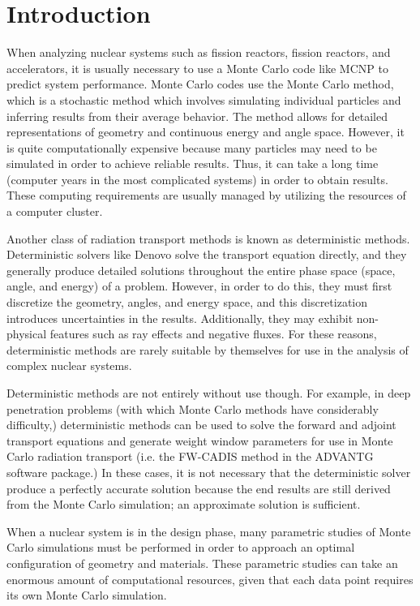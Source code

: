 \chapter{Introduction}
\label{chap:intro}

When analyzing nuclear systems such as fission reactors, fission reactors, and accelerators, it is usually necessary to use a Monte Carlo code like MCNP \cite{mcnp620} to predict system performance.
Monte Carlo codes use the Monte Carlo method, which is a stochastic method which involves simulating individual particles and inferring results from their average behavior.
The method allows for detailed representations of geometry and continuous energy and angle space.
However, it is quite computationally expensive because many particles may need to be simulated in order to achieve reliable results.
Thus, it can take a long time (computer years in the most complicated systems) in order to obtain results.
These computing requirements are usually managed by utilizing the resources of a computer cluster.

Another class of radiation transport methods is known as deterministic methods.
Deterministic solvers like Denovo \cite{denovo} solve the transport equation directly, and they generally produce detailed solutions throughout the entire phase space (space, angle, and energy) of a problem.
However, in order to do this, they must first discretize the geometry, angles, and energy space, and this discretization introduces uncertainties in the results.
Additionally, they may exhibit non-physical features such as ray effects and negative fluxes.
For these reasons, deterministic methods are rarely suitable by themselves for use in the analysis of complex nuclear systems.

Deterministic methods are not entirely without use though.
For example, in deep penetration problems (with which Monte Carlo methods have considerably difficulty,) deterministic methods can be used to solve the forward and adjoint transport equations and generate weight window parameters for use in Monte Carlo radiation transport (i.e. the FW-CADIS method \cite{fwcadis} in the ADVANTG \cite{advantg} software package.)
In these cases, it is not necessary that the deterministic solver produce a perfectly accurate solution because the end results are still derived from the Monte Carlo simulation; an approximate solution is sufficient.

When a nuclear system is in the design phase, many parametric studies of Monte Carlo simulations must be performed in order to approach an optimal configuration of geometry and materials.
These parametric studies can take an enormous amount of computational resources, given that each data point requires its own Monte Carlo simulation.

